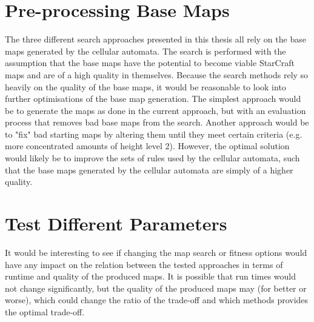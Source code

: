 \section{Pre-processing Base Maps}
\label{futurework_preprocess}
The three different search approaches presented in this thesis all rely on the base maps generated by the cellular automata. The search is performed with the assumption that the base maps have the potential to become viable StarCraft maps and are of a high quality in themselves. Because the search methods rely so heavily on the quality of the base maps, it would be reasonable to look into further optimisations of the base map generation. The simplest approach would be to generate the maps as done in the current approach, but with an evaluation process that removes bad base maps from the search. Another approach would be to "fix" bad starting maps by altering them until they meet certain criteria (e.g. more concentrated amounts of height level 2). However, the optimal solution would likely be to improve the sets of rules used by the cellular automata, such that the base maps generated by the cellular automata are simply of a higher quality.

\section{Test Different Parameters}
\label{futurework_differentparameters}
It would be interesting to see if changing the map search or fitness options would have any impact on the relation between the tested approaches in terms of runtime and quality of the produced maps. It is possible that run times would not change significantly, but the quality of the produced maps may (for better or worse), which could change the ratio of the trade-off and which methods provides the optimal trade-off.